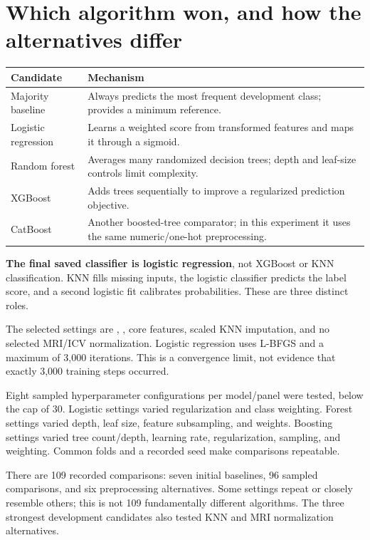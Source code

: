 \section{Which algorithm won, and how the alternatives differ}
\begin{center}\small\begin{tabular}{p{.23\linewidth}p{.67\linewidth}}\toprule
Candidate & Mechanism\\\midrule
Majority baseline & Always predicts the most frequent development class; provides a minimum reference.\\
Logistic regression & Learns a weighted score from transformed features and maps it through a sigmoid.\\
Random forest & Averages many randomized decision trees; depth and leaf-size controls limit complexity.\\
XGBoost & Adds trees sequentially to improve a regularized prediction objective.\\
CatBoost & Another boosted-tree comparator; in this experiment it uses the same numeric/one-hot preprocessing.\\\bottomrule
\end{tabular}\end{center}

\textbf{The final saved classifier is logistic regression}, not XGBoost or KNN classification. KNN fills missing inputs, the logistic classifier predicts the label score, and a second logistic fit calibrates probabilities. These are three distinct roles.

The selected settings are , , core features, scaled KNN imputation, and no selected MRI/ICV normalization. Logistic regression uses L-BFGS and a maximum of 3,000 iterations. This is a convergence limit, not evidence that exactly 3,000 training steps occurred.

Eight sampled hyperparameter configurations per model/panel were tested, below the cap of 30. Logistic settings varied regularization and class weighting. Forest settings varied depth, leaf size, feature subsampling, and weights. Boosting settings varied tree count/depth, learning rate, regularization, sampling, and weighting. Common folds and a recorded seed make comparisons repeatable.

There are 109 recorded comparisons: seven initial baselines, 96 sampled comparisons, and six preprocessing alternatives. Some settings repeat or closely resemble others; this is not 109 fundamentally different algorithms. The three strongest development candidates also tested KNN and MRI normalization alternatives.

